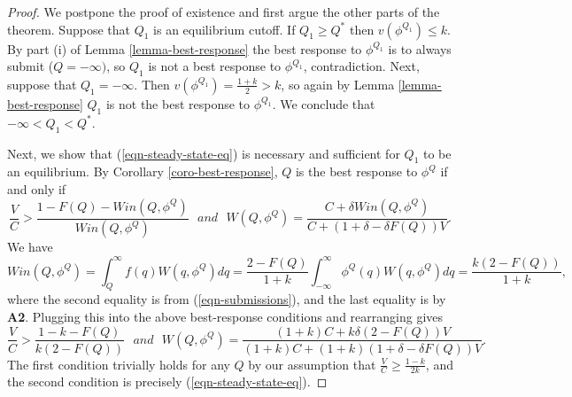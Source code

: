 \documentclass[12pt]{article}
\theoremstyle{plain}
\theoremstyle{definition}
\theoremstyle{remark}
\begin{document}
\begin{proof}
    We postpone the proof of existence and first argue the other parts of the theorem. Suppose that $Q_1$ is an equilibrium cutoff. If $Q_1\ge Q^*$ then $v(\phi^{Q_1})\le k$. By part (i) of Lemma \ref{lemma-best-response} the best response to $\phi^{Q_1}$ is to always submit ($Q=-\infty)$, so $Q_1$ is not a best response to $\phi^{Q_1}$, contradiction. Next, suppose that $Q_1=-\infty$. Then $v(\phi^{Q_1})=\frac{1+k}{2}>k$, so again by Lemma \ref{lemma-best-response} $Q_1$ is not the best response to $\phi^{Q_1}$. We conclude that $-\infty<Q_1<Q^*$.

    Next, we show that (\ref{eqn-steady-state-eq}) is necessary and sufficient for $Q_1$ to be an equilibrium. By Corollary \ref{coro-best-response}, $Q$ is the best response to $\phi^Q$ if and only if 
    $$\frac{V}{C} > \frac{1-F(Q)-Win(Q,\phi^Q)}{Win(Q,\phi^Q)} ~~~\textit{and}~~~ W(Q,\phi^{Q})= \frac{C+\delta Win(Q,\phi^{Q})}{C+(1+\delta-\delta F(Q))V}.$$
    We have
    $$Win(Q,\phi^Q) = \int_Q^{\infty} f(q)W(q,\phi^Q)dq = \frac{2-F(Q)}{1+k} \int_{-\infty}^{\infty} \phi^{Q}(q) W(q,\phi^Q)dq = \frac{k(2-F(Q))}{1+k},$$
    where the second equality is from (\ref{eqn-submissions}), and the last equality is by \textbf{A2}. Plugging this into the above best-response conditions and rearranging gives
    $$\frac{V}{C} > \frac{1-k-F(Q)}{k(2-F(Q))} ~~~\textit{and}~~~ W(Q,\phi^{Q})= \frac{(1+k)C+k\delta (2-F(Q))V}{(1+k)C+(1+k)(1+\delta -\delta F(Q))V}.$$
    The first condition trivially holds for any $Q$ by our assumption that $\frac{V}{C}\ge \frac{1-k}{2k}$, and the second condition is precisely (\ref{eqn-steady-state-eq}).
    
    

\end{proof}
\end{document}
